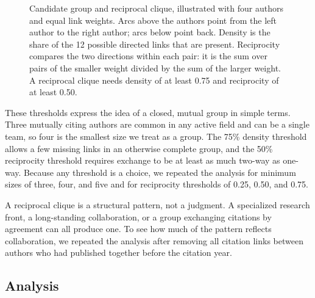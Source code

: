 \documentclass[12pt]{article}
\begin{document}
\begin{figure}[t]
  \caption{Candidate group and reciprocal clique, illustrated with four authors and equal link weights.  Arcs above the authors point from the left author to the right author; arcs below point back.  Density is the share of the 12 possible directed links that are present.  Reciprocity compares the two directions within each pair: it is the sum over pairs of the smaller weight divided by the sum of the larger weight.  A reciprocal clique needs density of at least 0.75 and reciprocity of at least 0.50.}
  \label{fig:clique-concept}
\end{figure}

These thresholds express the idea of a closed, mutual group in simple terms.  Three mutually citing authors are common in any active field and can be a single team, so four is the smallest size we treat as a group.  The 75\% density threshold allows a few missing links in an otherwise complete group, and the 50\% reciprocity threshold requires exchange to be at least as much two-way as one-way.  Because any threshold is a choice, we repeated the analysis for minimum sizes of three, four, and five and for reciprocity thresholds of 0.25, 0.50, and 0.75.

A reciprocal clique is a structural pattern, not a judgment.  A specialized research front, a long-standing collaboration, or a group exchanging citations by agreement can all produce one.  To see how much of the pattern reflects collaboration, we repeated the analysis after removing all citation links between authors who had published together before the citation year.

\subsection{Analysis}
\label{sec:analysis}
\end{document}
